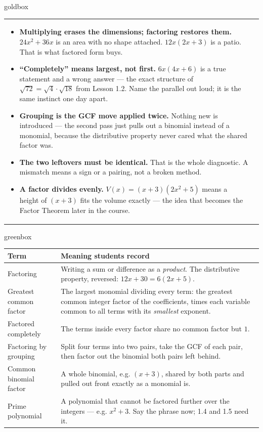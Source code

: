 \documentclass[10pt]{article}
\begin{document}
\begin{skillbox}{goldbox}
\begin{tabularx}{\linewidth}{@{}X|X@{}}
\begin{minipage}[t]{\linewidth}
\begin{itemize}[leftmargin=1.1em, itemsep=2pt, topsep=2pt]
        is why ``multiply it back'' is the standing instruction.
  \item \textbf{Multiplying erases the dimensions; factoring restores them.} $24x^2+36x$ is an
        area with no shape attached. $12x(2x+3)$ is a patio. That is what factored form buys.
  \item \textbf{``Completely'' means largest, not first.} $6x(4x+6)$ is a true statement and a
        wrong answer --- the exact structure of $\sqrt{72}=\sqrt4\cdot\sqrt{18}$ from Lesson 1.2.
        Name the parallel out loud; it is the same instinct one day apart.
  \item \textbf{Grouping is the GCF move applied twice.} Nothing new is introduced --- the second
        pass just pulls out a binomial instead of a monomial, because the distributive property
        never cared what the shared factor was.
  \item \textbf{The two leftovers must be identical.} That is the whole diagnostic. A mismatch means
        a sign or a pairing, not a broken method.
  \item \textbf{A factor divides evenly.} $V(x)=(x+3)\left(2x^2+5\right)$ means a height of $(x+3)$
        fits the volume exactly --- the idea that becomes the Factor Theorem later in the course.
\end{itemize}
\end{minipage}
\end{tabularx}
\end{skillbox}

\begin{skillbox}{greenbox}
\renewcommand{\arraystretch}{1.35}
\begin{tabularx}{\linewidth}{@{}p{3.6cm}X@{}}
\textbf{Term} & \textbf{Meaning students record} \\
\hline
Factoring & Writing a sum or difference as a \emph{product}. The distributive property, reversed:
    $12x+30 = 6(2x+5)$. \\
Greatest common factor & The largest monomial dividing every term: the greatest common integer
    factor of the coefficients, times each variable common to all terms with its \emph{smallest}
    exponent. \\
Factored completely & The terms inside every factor share no common factor but $1$. \\
Factoring by grouping & Split four terms into two pairs, take the GCF of each pair, then factor out
    the binomial both pairs left behind. \\
Common binomial factor & A whole binomial, e.g. $(x+3)$, shared by both parts and pulled out front
    exactly as a monomial is. \\
Prime polynomial & A polynomial that cannot be factored further over the integers --- e.g.
    $x^2+3$. Say the phrase now; 1.4 and 1.5 need it. \\
\end{tabularx}
\end{skillbox}
\end{document}
